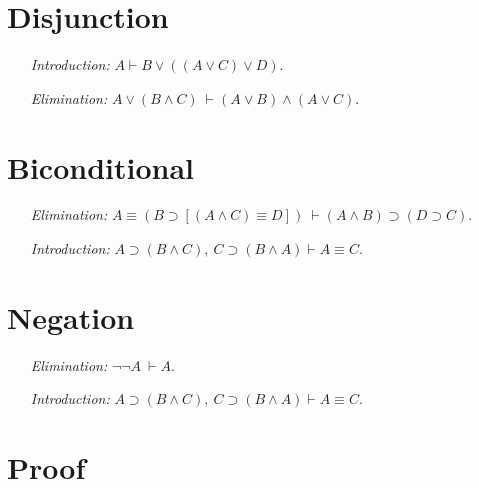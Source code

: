 \documentclass[a4paper, 11pt]{article} %
\begin{document}
\section*{Disjunction}

\begin{enumerate}
  \item[\it Introduction:] $A \vdash B \vee ((A \vee C) \vee D)$.
  \item[\it Elimination:] $A\vee(B\wedge C)\ \vdash (A \vee B) \wedge (A \vee C)$. 
\end{enumerate}



\section*{Biconditional}

\begin{enumerate}
  \item[\it Elimination:] $A \equiv (B \supset [(A \wedge C)\equiv D])\ \vdash (A\wedge B) \supset (D \supset C)$. 
  \item[\it Introduction:] $A \supset (B \wedge C),\ C \supset (B \wedge A) \vdash A \equiv C$.
\end{enumerate}






\section*{Negation}

\begin{enumerate}
  \item[\it Elimination:] $\neg\neg A\ \vdash A$. 
  \item[\it Introduction:] $A \supset (B \wedge C),\ C \supset (B \wedge A) \vdash A \equiv C$.
\end{enumerate}





\section*{Proof}
\end{document}
